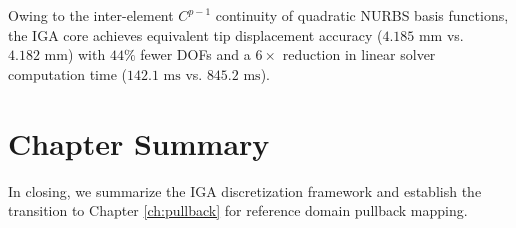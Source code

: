 \begin{table}[htbp]
    \centering
    \caption{Linear solution accuracy validation comparing full-order IGA degrees of freedom against fine-mesh Lagrangian FEM frameworks.}
    \label{tab:linear_validation}
\end{table}

Owing to the inter-element $C^{p-1}$ continuity of quadratic NURBS basis functions, the IGA core achieves equivalent tip displacement accuracy ($4.185\text{ mm}$ vs. $4.182\text{ mm}$) with $44\%$ fewer DOFs and a $6\times$ reduction in linear solver computation time ($142.1\text{ ms}$ vs. $845.2\text{ ms}$).

\section{Chapter Summary}

In closing, we summarize the IGA discretization framework and establish the transition to Chapter \ref{ch:pullback} for reference domain pullback mapping.

